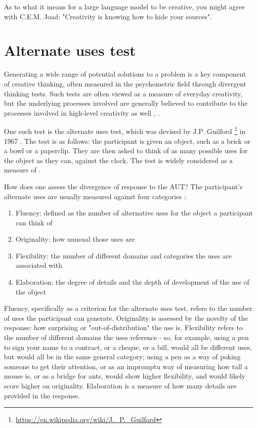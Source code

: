 \documentclass{article}
\begin{document}
As to what it means for a large language model to be creative, you might agree with C.E.M. Joad: "Creativity is knowing how to hide your sources". 

\section{Alternate uses test}
\label{sec:alternate_uses}
Generating a wide range of potential solutions to a problem is a key component of creative thinking, often measured in the psychometric field through divergent thinking tests. Such tests are often viewed as a measure of everyday creativity, but the underlying processes involved are generally believed to contribute to the processes involved in high-level creativity as well \citet{kozbelt2010theories}, \citet{runco1990theories}. 

One such test is the alternate uses test, which was devised by J.P. Guilford \footnote{\url{https://en.wikipedia.org/wiki/J._P._Guilford}} in 1967 \citet{guilford1978alternate}. The test is as follows: the participant is given an object, such as a brick or a bowl or a paperclip. They are then asked to think of as many possible uses for the object as they can, against the clock. The test is widely considered as a measure of .

How does one assess the divergence of response to the AUT? The participant's alternate uses are usually measured against four categories \citet{plucker2010assessment}:

\begin{enumerate}
    \item Fluency: defined as the number of alternative uses for the object a participant can think of
    \item Originality: how unusual those uses are
    \item Flexibility: the number of different domains and categories the uses are associated with
    \item Elaboration: the degree of details and the depth of development of the use of the object
\end{enumerate}
Fluency, specifically as a criterion for the alternate uses test, refers to the number of uses the participant can generate. Originality is assessed by the novelty of the response: how surprising or "out-of-distribution" the use is. Flexibility refers to the number of different domains the uses reference - so, for example, using a pen to sign your name to a contract, or a cheque, or a bill, would all be different uses, but would all be in the same general category; using a pen as a way of poking someone to get their attention, or as an impromptu way of measuring how tall a mouse is, or as a bridge for ants, would show higher flexibility, and would likely score higher on originality. Elaboration is a measure of how many details are provided in the response.
\end{document}
